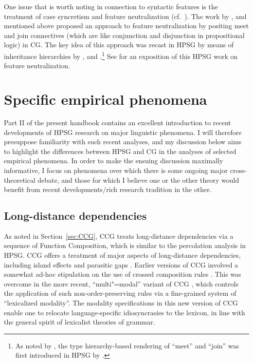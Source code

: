 \documentclass[output=paper
                ,modfonts
 	        ,biblatex
                ,babelshorthands
                ,newtxmath
                ,draftmode
                ,colorlinks, citecolor=brown
]{langscibook}
\begin{document}
One issue that is worth noting in connection to syntactic features is
the treatment of case syncretism and feature neutralization
(cf.~). The work by
\citet[Chapter~6]{Morrill94a-u}, \citet{Bayer96} and \citet{BJ95} mentioned
above proposed an approach
to feature neutralization by positing meet and join connectives (which
are like conjunction and disjunction in propositional logic) in CG.
The key idea of this approach was recast in HPSG by means of
inheritance hierarchies by \citet{levy:01}, \citet{lev:pol:01} and
\citet{dani:01}.\footnote{As noted by \citet{levy:01}, the
  type hierarchy-based rendering of ``meet'' and ``join''
  was first introduced in HPSG by \citet*[Section~6.3.2]{LHC2001a-u}.} See
 for an 
exposition of this HPSG work on feature neutralization.


\section{Specific empirical phenomena \label{phenomena}}

Part II of the present handbook contains an excellent introduction to
recent developments of HPSG research on major linguistic phenomena. I
will therefore presuppose familiarity with such recent analyses, and my discussion below aims to highlight the
differences between HPSG and CG in the analyses of selected
empirical phenomena. In order to make the ensuing discussion maximally
informative, I focus on phenomena over which there is some ongoing
major cross-theoretical debate, and those for which I believe one or
the other theory would benefit from recent developments/rich research
tradition in the other.


\subsection{Long-distance dependencies}

As noted in Section~\ref{sec:CCG}, CCG treats long-distance
dependencies via a sequence of Function Composition, which is similar
to the \slasch percolation analysis in HPSG. CCG offers a treatment of
major aspects of long-distance dependencies, including island effects
\citep[Section~4.2]{Steedman2000a-u} and parasitic gaps \citep{Steedman87a-u}.
Earlier versions of CCG involved a somewhat ad-hoc stipulation on the
use of crossed composition rules \citep{Steedman97a}. This was
overcome in the more recent, ``multi"=modal'' variant of CCG
\citep{Baldridge2002a-u}, which controls the application of such
non-order-preserving rules via a fine-grained system of
``lexicalized modality''. The modality specifications in this new version of CCG
enable one to relocate language-specific idiosyncrasies to the
lexicon, in line with the general spirit of lexicalist theories of
grammar.
\end{document}
